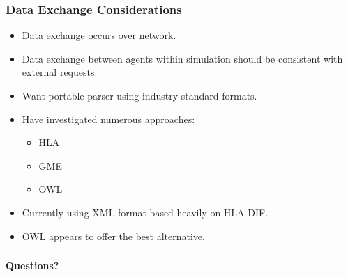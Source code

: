 \documentclass{beamer}
\begin{document}
\begin{frame}
  \frametitle{Data Exchange Considerations}

  \begin{itemize}
  \item Data exchange occurs over network.
  \item Data exchange between agents within simulation should be
    consistent with external requests.
  \item Want portable parser using industry standard formats.
  \item Have investigated numerous approaches:
    \begin{itemize}
    \item HLA
    \item GME
    \item OWL
    \end{itemize}
  \item Currently using XML format based heavily on HLA-DIF.
  \item OWL appears to offer the best alternative.
  \end{itemize}
  

\end{frame}




%
%
%
%



%    
%  
%
%
%





\begin{frame}
  \frametitle{}

  \centerline{\textbf{\Large Questions?}}
  
\end{frame}
\end{document}
